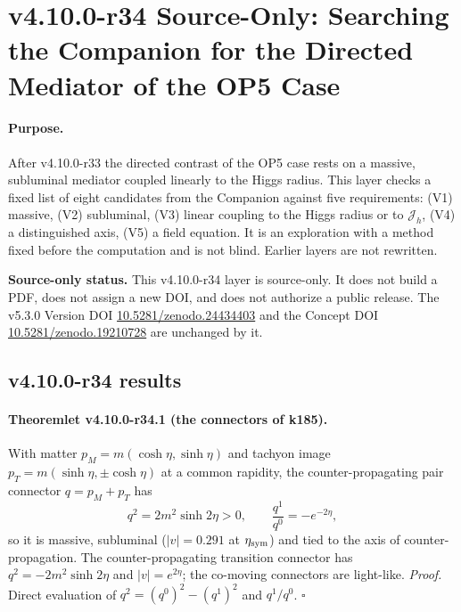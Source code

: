 \clearpage
\section*{v4.10.0-r34 Source-Only: Searching the Companion for the Directed Mediator of the OP5 Case}
\label{sec:v4100-r34-mediator}

\paragraph{Purpose.}
After v4.10.0-r33 the directed contrast of the OP5 case rests on a massive, subluminal mediator coupled linearly to the Higgs radius.  This
layer checks a fixed list of eight candidates from the Companion against five requirements: (V1) massive, (V2) subluminal, (V3) linear
coupling to the Higgs radius or to \(\mathcal J_h\), (V4) a distinguished axis, (V5) a field equation.  It is an exploration with a method
fixed before the computation and is not blind.  Earlier layers are not rewritten.

\noindent\textbf{Source-only status.}
This v4.10.0-r34 layer is source-only.  It does not build a PDF, does not assign a new DOI,
and does not authorize a public release.  The v5.3.0 Version DOI
\href{https://doi.org/10.5281/zenodo.24434403}{10.5281/zenodo.24434403} and the Concept DOI
\href{https://doi.org/10.5281/zenodo.19210728}{10.5281/zenodo.19210728} are unchanged by it.

\subsection*{v4.10.0-r34 results}
\label{subsec:v4100-r34-results}

\paragraph{Theoremlet v4.10.0-r34.1 (the connectors of k185).}
With matter \(p_M=m(\cosh\eta,\sinh\eta)\) and tachyon image \(p_T=m(\sinh\eta,\pm\cosh\eta)\) at a common rapidity, the counter-propagating pair
connector \(q=p_M+p_T\) has
\[
 q^2=2m^2\sinh2\eta>0,\qquad \frac{q^1}{q^0}=-e^{-2\eta},
\]
so it is massive, subluminal (\(|v|=0.291\) at \(\eta_{\rm sym}\)) and tied to the axis of counter-propagation.  The counter-propagating
transition connector has \(q^2=-2m^2\sinh2\eta\) and \(|v|=e^{2\eta}\); the co-moving connectors are light-like.  \emph{Proof.} Direct
evaluation of \(q^2=(q^0)^2-(q^1)^2\) and \(q^1/q^0\).  \(\square\)

